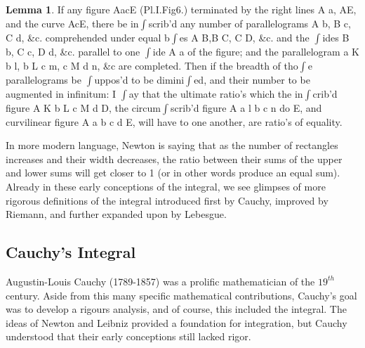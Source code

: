 \documentclass{article}
\theoremstyle{axiom} \newtheorem{axiom}{Axiom}
\theoremstyle{definition} \newtheorem{definition}{Definition}
\theoremstyle{example} \newtheorem{example}{Example}
\theoremstyle{proposition} \newtheorem{prop}{Proposition}
\theoremstyle{lemma} \newtheorem{lemma}{Lemma}
\begin{document}
\begin{lemma}\cite[Lemma II]{newton:}
	If any figure AacE (Pl.I.Fig6.) terminated by the right lines A a, AE, and 
	the curve AcE, there be in$\int$scrib'd any number of parallelograms A b, 
	B c, C d, \&c. comprehended under equal b$\int$es A B,B C, C D, \&c. and the 
	$\int$ides B b, C c, D d, \&c. parallel to one $\int$ide A a of the figure; 
	and the parallelogram a K b l, b L c m, c M d n, \&c are completed. Then if 
	the breadth of tho$\int$e parallelograms be $\int$uppos'd to be 
	dimini$\int$ed, and their number to be augmented in infinitum: I $\int$ay 
	that the ultimate ratio's which the in$\int$crib'd figure A K b L c M d D, 
	the circum$\int$scrib'd figure A a l b c n do E, and curvilinear figure 
	A a b c d E, will have to one another, are ratio's of equality. 
\end{lemma}
In more modern language, Newton is saying that as the number of rectangles 
increases and their width decreases, the ratio between their sums of the upper
and lower sums will get closer to 1 (or in other words produce an equal sum). 
Already in these early conceptions of the integral, we see glimpses of more 
rigorous definitions of the integral introduced first by Cauchy,
improved by Riemann, and further expanded upon by Lebesgue.

\subsection{Cauchy's Integral}

Augustin-Louis Cauchy (1789-1857) was a prolific mathematician of the $19^{th}$ century. 
Aside from this many specific mathematical contributions, Cauchy's goal was 
to develop a rigours analysis, and of course, this included the integral. 
The ideas of Newton and Leibniz provided a foundation for integration, but Cauchy
understood that their early conceptions still lacked rigor. 
\end{document}
